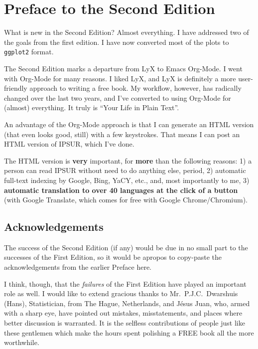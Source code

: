 %
%

\cleardoublepage
{}
{}

\chapter*{Preface to the Second Edition}

What is new in the Second Edition?  Almost everything.  I have addressed two of the goals from the first edition.  I have now converted most of the plots to \texttt{ggplot2} format. 

The Second Edition marks a departure from LyX to Emacs Org-Mode.  I went with Org-Mode for many reasons.  I liked LyX, and LyX is definitely a more user-friendly approach to writing a free book.  My workflow, however, has radically changed over the last two years, and I've converted to using Org-Mode for (almost) everything.  It truly is ``Your Life in Plain Text''.

An advantage of the Org-Mode approach is that I can generate an HTML version (that even looks good, still) with a few keystrokes.  That means I can post an HTML version of IPSUR, which I've done.  

The HTML version is \textbf{very} important, for \textbf{more} than the following reasons:  1) a person can read IPSUR without need to do anything else, period, 2) automatic full-text indexing by Google, Bing, YaCY, etc., and, most importantly to me, 3) \textbf{automatic translation to over 40 languages at the click of a button} (with Google Translate, which comes for free with Google Chrome/Chromium).


\section*{Acknowledgements}

The success of the Second Edition (if any) would be due in no small part to the successes of the First Edition, so it would be apropos to copy-paste the acknowledgements from the earlier Preface here.

I think, though, that the \emph{failures} of the First Edition have played an important role as well. I would like to extend gracious thanks to Mr.\ P.J.C.\ Dwarshuis (Hans), Statistician, from The Hague, Netherlands, and J\'{e}{}sus Juan, who, armed with a sharp eye, have pointed out mistakes, misstatements, and places where better discussion is warranted.  It is the selfless contributions of people just like these gentlemen which make the hours spent polishing a FREE book all the more worthwhile.